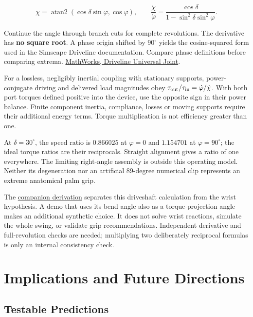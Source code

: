 \documentclass[
  11pt,
]{article}
\begin{document}
\[
\chi=\operatorname{atan2}(\cos\delta\sin\varphi,\cos\varphi),
\qquad
\frac{\dot\chi}{\dot\varphi}
=\frac{\cos\delta}{1-\sin^2\delta\sin^2\varphi}.
\]

Continue the angle through branch cuts for complete revolutions. The
derivative has \textbf{no square root}. A phase origin shifted by
\(90^\circ\) yields the cosine-squared form used in the Simscape
Driveline documentation. Compare phase definitions before comparing
extrema.
\href{https://www.mathworks.com/help/sdl/ref/universaljoint.html}{MathWorks,
Driveline Universal Joint}.

For a lossless, negligibly inertial coupling with stationary supports,
power-conjugate driving and delivered load magnitudes obey
\(\tau_{\rm out}/\tau_{\rm in}=\dot\varphi/\dot\chi\). With both port
torques defined positive into the device, use the opposite sign in their
power balance. Finite component inertia, compliance, losses or moving
supports require their additional energy terms. Torque multiplication is
not efficiency greater than one.

At \(\delta=30^\circ\), the speed ratio is \(0.866025\) at \(\varphi=0\)
and \(1.154701\) at \(\varphi=90^\circ\); the ideal torque ratios are
their reciprocals. Straight alignment gives a ratio of one everywhere.
The limiting right-angle assembly is outside this operating model.
Neither its degeneration nor an artificial 89-degree numerical clip
represents an extreme anatomical palm grip.

The
\href{https://github.com/D-sorganization/AffineDrift/blob/main/content/wrist-as-universal-joint/MATHEMATICAL_DERIVATION.md}{companion
derivation} separates this driveshaft calculation from the wrist
hypothesis. A demo that uses its bend angle also as a torque-projection
angle makes an additional synthetic choice. It does not solve wrist
reactions, simulate the whole swing, or validate grip recommendations.
Independent derivative and full-revolution checks are needed;
multiplying two deliberately reciprocal formulas is only an internal
consistency check.

\section{Implications and Future
Directions}\label{implications-and-future-directions}

\subsection{Testable Predictions}\label{testable-predictions}
\end{document}
